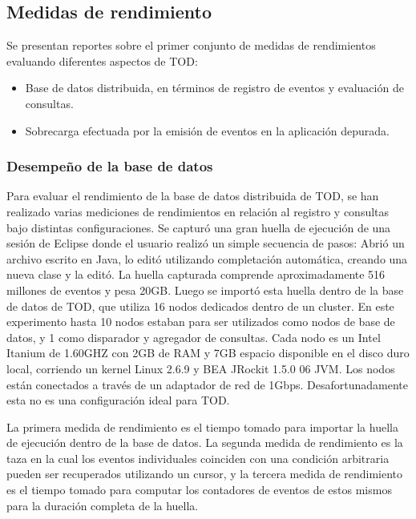 \documentclass[12pt,legalpaper]{report}
\begin{document}
		\subsection{Medidas de rendimiento}

Se presentan reportes sobre el primer conjunto de medidas de rendimientos evaluando diferentes aspectos de TOD:

\begin{itemize}
	\item Base de datos distribuida, en términos de registro de eventos y evaluación de consultas.
	\item Sobrecarga efectuada por la emisión de eventos en la aplicación depurada.
\end{itemize}

			\subsubsection{Desempeño de la base de datos}


Para evaluar el rendimiento de la base de datos distribuida de TOD, se han realizado varias mediciones de rendimientos en relación al registro y consultas bajo distintas configuraciones.  Se capturó una gran huella de ejecución de una sesión de Eclipse donde el usuario realizó un simple secuencia de pasos: Abrió un archivo escrito en Java, lo editó utilizando completación automática, creando una nueva clase y la editó. La huella capturada comprende aproximadamente 516 millones de eventos y pesa 20GB.  Luego se importó esta huella dentro de la base de datos de TOD, que utiliza 16 nodos dedicados dentro de un cluster.  En este experimento hasta 10 nodos estaban para ser utilizados como nodos de base de datos, y 1 como disparador y agregador de consultas.  Cada nodo es un Intel Itanium de 1.60GHZ con 2GB de RAM y 7GB espacio disponible en el disco duro local, corriendo un kernel Linux 2.6.9 y BEA JRockit 1.5.0 06 JVM.  Los nodos están conectados a través de un adaptador de red de 1Gbps.  Desafortunadamente esta no es una configuración ideal para TOD.

La primera medida de rendimiento es el tiempo tomado para importar la huella de ejecución dentro de la base de datos.  La segunda medida de rendimiento es la taza en la cual los eventos individuales coinciden con una condición arbitraria pueden ser recuperados utilizando un cursor, y la tercera medida de rendimiento es el tiempo tomado para computar los contadores de eventos de estos mismos para la duración completa de la huella.
\end{document}

